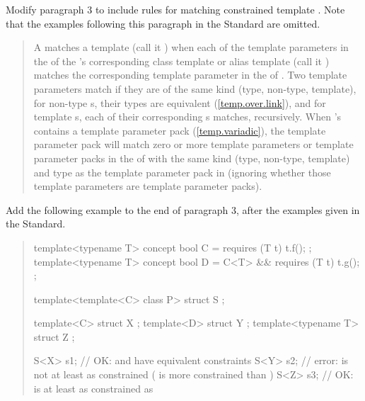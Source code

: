 Modify paragraph 3 to include rules for matching constrained template 
. Note that the examples following this 
paragraph in the \Cpp Standard are omitted.

\begin{quote}
\setcounter{Paras}{2}
\pnum
A  matches  a template 
  (call it ) when each of the 
template parameters in the  of the 
's corresponding class template or alias 
template (call it  ) matches the corresponding template parameter in 
the  of .
% 
Two template parameters match if they are of the same kind (type, non-type, 
template), for non-type s, their types are 
equivalent (\ref{temp.over.link}), and for template 
s, each of their corresponding
s matches, recursively. 
% 
When 's  
contains a template parameter pack (\ref{temp.variadic}), the template 
parameter pack will match zero or more template parameters or template 
parameter packs in the  of
 with the same kind (type, non-type, template) and type as the template 
parameter pack in  (ignoring whether those template parameters are
template parameter packs).
\end{quote}

Add the following example to the end of paragraph 3, after the
examples given in the \Cpp Standard.

\begin{quote}
\begin{addedblock}
\enterexample
\begin{codeblock}
template<typename T> concept bool C = requires (T t) { t.f(); };
template<typename T> concept bool D = C<T> && requires (T t) { t.g(); };

template<template<C> class P>
  struct S { };

template<C> struct X { };
template<D> struct Y { };
template<typename T> struct Z { };

S<X> s1; // OK:  and  have equivalent constraints
S<Y> s2; // error:  is not at least as constrained  ( is more constrained than )
S<Z> s3; // OK:  is at least as constrained as 
\end{codeblock}
\exitexample
\end{addedblock}
\end{quote}


